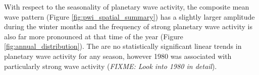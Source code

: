 With respect to the seasonality of planetary wave activity, the composite mean wave pattern (Figure \ref{fig:pwi_spatial_summary}) has a slightly larger amplitude during the winter months and the frequency of strong planetary wave activity is also far more pronounced at that time of the year (Figure \ref{fig:annual_distribution}). The are no statistically significant linear trends in planetary wave activity for any season, however 1980 was associated with particularly strong wave activity (\textit{FIXME: Look into 1980 in detail}).
